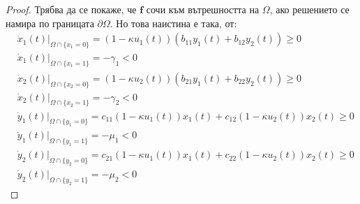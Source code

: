 \begin{proof}
  Трябва да се покаже, че $\mathbf{f}$ сочи към вътрешността на $\Omega$, ако решението се намира по границата $\partial \Omega$. Но това наистина е така, от:
  \begin{equation}
    \begin{split}
      &\dot{x}_1(t)\vert_{\Omega \cap \{x_1=0\}} = (1-\kappa u_1(t))(b_{11} y_1(t) + b_{12} y_2(t)) \geq 0 \\
      &\dot{x}_1(t)\vert_{\Omega \cap \{x_1=1\}} = - \gamma_1 < 0 \\
      &\dot{x}_2(t)\vert_{\Omega \cap \{x_2=0\}} = (1-\kappa u_2(t))(b_{21} y_1(t) + b_{22} y_2(t)) \geq 0 \\
      &\dot{x}_2(t)\vert_{\Omega \cap \{x_2=1\}} = - \gamma_2 < 0 \\
      &\dot{y}_1(t)\vert_{\Omega \cap \{y_1=0\}} = c_{11}(1-\kappa u_1(t)) x_1(t) + c_{12}(1-\kappa u_2(t)) x_2(t) \geq 0 \\
      &\dot{y}_1(t)\vert_{\Omega \cap \{y_1=1\}} = - \mu_1 < 0 \\
      &\dot{y}_2(t)\vert_{\Omega \cap \{y_2=0\}} = c_{21}(1-\kappa u_1(t)) x_1(t) + c_{22}(1-\kappa u_2(t)) x_2(t) \geq 0 \\
      &\dot{y}_2(t)\vert_{\Omega \cap \{y_2=1\}} = - \mu_2 < 0
    \end{split}
  \end{equation}
\end{proof}

